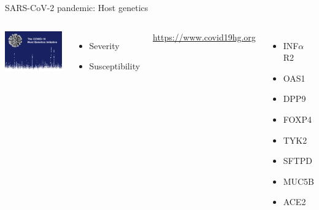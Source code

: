 \documentclass[10pt]{beamer}
\begin{document}
\begin{frame}{SARS-CoV-2 pandemic: Host genetics}
	\begin{columns}
		\begin{center}
			\includegraphics[width=\textwidth]{./figures/covid19hg.png}\par
		\end{center}
		\begin{itemize}
			\item Severity
			\item Susceptibility
		\end{itemize}
		\url{https://www.covid19hg.org}
		\begin{itemize}
			\item INF$\alpha$R2 
			\item OAS1
			\item DPP9
			\item FOXP4
			\item TYK2
			\item SFTPD
			\item MUC5B
			\item ACE2
		\end{itemize}
	\end{columns}
\end{frame}
\end{document}
